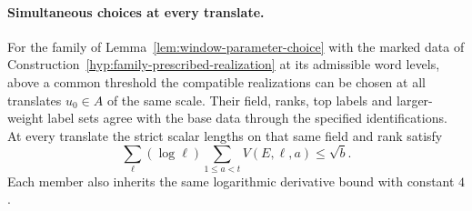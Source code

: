 \paragraph{Simultaneous choices at every translate.}
\begin{proposition}\label{prop:translate-completion}
For the family of Lemma~\ref{lem:window-parameter-choice} with the marked data of Construction~\ref{hyp:family-prescribed-realization} at its admissible word levels, above a common threshold the compatible
realizations can be chosen at all translates \(u_0\in A\) of the
same scale. Their field, ranks, top labels and larger-weight label
sets agree with the base data through the specified identifications.
At every translate the strict scalar lengths on that same field and rank satisfy
\[
 \sum_\ell(\log\ell)\sum_{1\le a<t}V(E,\ell,a)\le\sqrt b .
\]
Each member also inherits the same logarithmic derivative bound with constant \(4\).
\end{proposition}

